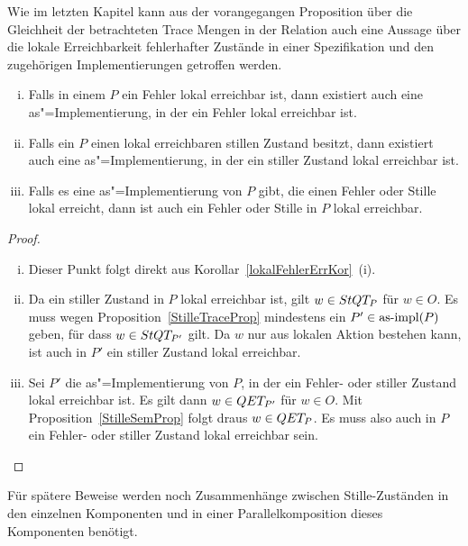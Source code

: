 Wie im letzten Kapitel kann aus der vorangegangen Proposition über die
Gleichheit der betrachteten Trace Mengen in der Relation \QRel{} auch eine
Aussage über die lokale Erreichbarkeit \glqq fehlerhafter Zustände\grqq{} in
einer Spezifikation und den zugehörigen Implementierungen getroffen werden.

\begin{Kor}\mbox{}
  \label{lokaleStilleErrKor}
  \begin{enumerate}[(i)]
    \item Falls in einem \MEIO{} $P$ ein Fehler lokal erreichbar ist, dann
      existiert auch eine as"=Implementierung, in der ein Fehler lokal
      erreichbar ist.
    \item Falls ein \MEIO{} $P$ einen lokal erreichbaren stillen Zustand
      besitzt, dann existiert auch eine as"=Implementierung, in der ein
      stiller Zustand lokal erreichbar ist.
    \item Falls es eine as"=Implementierung von $P$ gibt, die einen Fehler oder
      Stille lokal erreicht, dann ist auch ein Fehler oder Stille in $P$ lokal
      erreichbar.
  \end{enumerate}
\end{Kor}
\begin{proof}\mbox{}
  \begin{enumerate}[(i)]
    \item Dieser Punkt folgt direkt aus Korollar~\ref{lokalFehlerErrKor}~(i).
    \item Da ein stiller Zustand in $P$ lokal erreichbar ist, gilt $w\in StQT
      _P$ für $w\in O$. Es muss wegen Proposition~\ref{StilleTraceProp}
      mindestens ein $P'\in \mathrm{as}\text{-}\mathrm{impl} (P)$ geben, für dass $w\in StQT _{P'}$
      gilt. Da $w$ nur aus lokalen Aktion bestehen kann, ist auch in $P'$ ein
      stiller Zustand lokal erreichbar.
    \item Sei $P'$ die as"=Implementierung von $P$, in der ein Fehler- oder
      stiller Zustand lokal erreichbar ist. Es gilt dann $w\in QET _{P'}$ für
      $w\in O$. Mit Proposition~\ref{StilleSemProp} folgt draus $w\in QET _P$.
      Es muss also auch in $P$ ein Fehler- oder stiller Zustand lokal
      erreichbar sein.
  \end{enumerate}
\end{proof}

Für spätere Beweise werden noch Zusammenhänge zwischen Stille-Zuständen in den
einzelnen Komponenten und in einer Parallelkomposition dieses Komponenten
benötigt.


